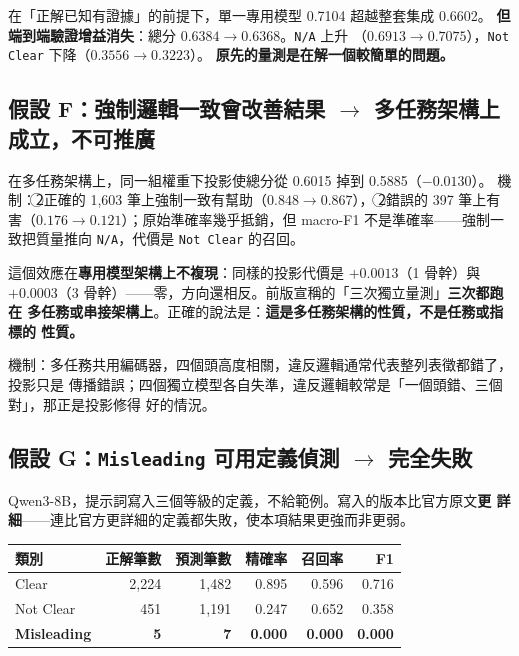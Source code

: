 \documentclass[11pt,a4paper]{ctexart}
\newcommand{\fn}[1]{\texttt{#1}}
\begin{document}
在「正解已知有證據」的前提下，單一專用模型 0.7104 超越整套集成 0.6602。
\textbf{但端到端驗證增益消失}：總分 $0.6384 \to 0.6368$。\fn{N/A} 上升
（$0.6913 \to 0.7075$），\fn{Not Clear} 下降（$0.3556 \to 0.3223$）。
\textbf{原先的量測是在解一個較簡單的問題。}

\subsection*{假設 F：強制邏輯一致會改善結果 $\to$ 多任務架構上成立，不可推廣}

在多任務架構上，同一組權重下投影使總分從 0.6015 掉到 0.5885（$\mathbf{-0.0130}$）。
機制：\textcircled{2}正確的 1{,}603 筆上強制一致有幫助（$0.848 \to 0.867$），
\textcircled{2}錯誤的 397 筆上有害（$0.176 \to 0.121$）；原始準確率幾乎抵銷，但
macro-F1 不是準確率——強制一致把質量推向 \fn{N/A}，代價是 \fn{Not Clear} 的召回。

\begin{tcolorbox}[colback=red!5, colframe=red!50, title=本版修正]
這個效應在\textbf{專用模型架構上不複現}：同樣的投影代價是 $+0.0013$（1 骨幹）與
$+0.0003$（3 骨幹）——零，方向還相反。前版宣稱的「三次獨立量測」\textbf{三次都跑在
多任務或串接架構上}。正確的說法是：\textbf{這是多任務架構的性質，不是任務或指標的
性質。}

\medskip
機制：多任務共用編碼器，四個頭高度相關，違反邏輯通常代表整列表徵都錯了，投影只是
傳播錯誤；四個獨立模型各自失準，違反邏輯較常是「一個頭錯、三個對」，那正是投影修得
好的情況。
\end{tcolorbox}

\subsection*{假設 G：\fn{Misleading} 可用定義偵測 $\to$ 完全失敗}

Qwen3-8B，提示詞寫入三個等級的定義，不給範例。寫入的版本比官方原文\textbf{更
詳細}——連比官方更詳細的定義都失敗，使本項結果更強而非更弱。

\begin{table}[h]
\centering\small
\begin{tabular}{@{}lrrrrr@{}}
\toprule
類別 & 正解筆數 & 預測筆數 & 精確率 & 召回率 & F1 \\
\midrule
Clear     & 2{,}224 & 1{,}482 & 0.895 & 0.596 & 0.716 \\
Not Clear & 451     & 1{,}191 & 0.247 & 0.652 & 0.358 \\
\rowcolor{red!10}
\textbf{Misleading} & \textbf{5} & \textbf{7} & \textbf{0.000} & \textbf{0.000} & \textbf{0.000} \\
\bottomrule
\end{tabular}
\end{table}
\end{document}
